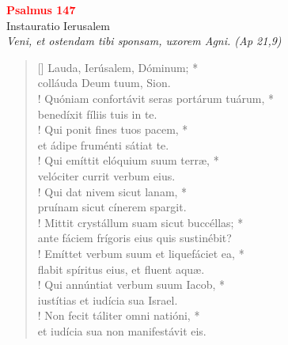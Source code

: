 


\def\greinitialformat#1{%
{\fontsize{39}{39}\selectfont #1}%
}




\vspace{0.3cm}
\begin{center}
 \textcolor{red}{\large \bf Psalmus 147}\\
Instauratio Ierusalem\\
\textit{\small Veni, et ostendam tibi sponsam, uxorem Agni. (Ap 21,9)}
\end{center}
\begin{verse}[\versewidth]
Lauda, Ierúsalem, Dóminum; *\\
colláuda Deum tuum, Sion.\\!
\vin Quóniam confortávit seras portárum tuárum, *\\
\vin benedíxit fíliis tuis in te.\\!
Qui ponit fines tuos pacem, *\\
et ádipe fruménti sátiat te.\\!
\vin Qui emíttit elóquium suum terræ, *\\
\vin velóciter currit verbum eius.\\!
Qui dat nivem sicut lanam, *\\
pruínam sicut cínerem spargit.\\!
\vin Mittit crystállum suam sicut buccéllas; *\\
\vin ante fáciem frígoris eius quis sustinébit?\\!
Emíttet verbum suum et liquefáciet ea, *\\
flabit spíritus eius, et fluent aquæ.\\!
\vin Qui annúntiat verbum suum Iacob, *\\
\vin iustítias et iudícia sua Israel.\\!
Non fecit táliter omni natióni, *\\
et iudícia sua non manifestávit eis.\\
\end{verse}
\vspace{1cm}



